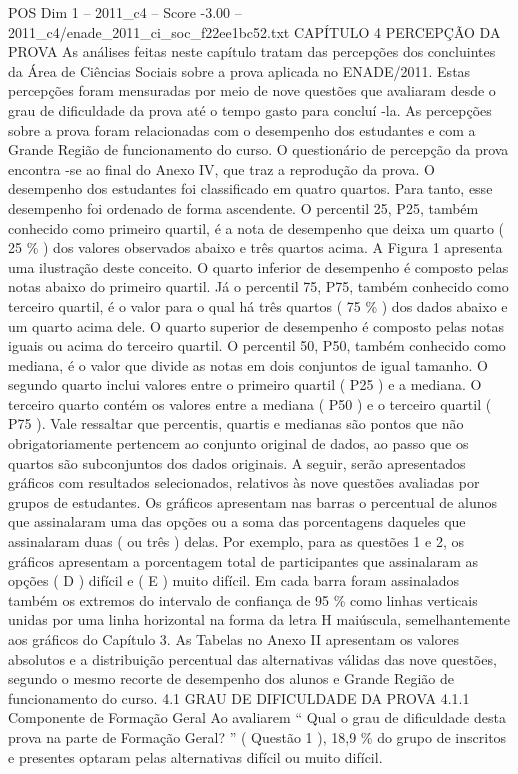 \begin{textsample}{POS Dim 1 – 2011\_c4 – Score -3.00 – 2011\_c4/enade\_2011\_ci\_soc\_f22ee1bc52.txt}  \label{ex:f1_pos_323}
CAPÍTULO 4 PERCEPÇÃO DA PROVA As análises feitas neste capítulo tratam das percepções dos concluintes da Área de Ciências Sociais sobre a prova aplicada no ENADE/2011.
Estas percepções foram mensuradas por meio de nove questões que avaliaram desde o grau de dificuldade da prova até o tempo gasto para concluí -la.
As percepções sobre a prova foram relacionadas com o desempenho dos estudantes e com a Grande Região de funcionamento do curso.
O questionário de percepção da prova encontra -se ao final do Anexo IV, que traz a reprodução da prova.
O desempenho dos estudantes foi classificado em quatro quartos.
Para tanto, esse desempenho foi ordenado de forma ascendente.
O percentil 25, P25, também conhecido como primeiro quartil, é a nota de desempenho que deixa um quarto ( 25 \% ) dos valores observados abaixo e três quartos acima.
A Figura 1 apresenta uma ilustração deste conceito.
O quarto inferior de desempenho é composto pelas notas abaixo do primeiro quartil.
Já o percentil 75, P75, também conhecido como terceiro quartil, é o valor para o qual há três quartos ( 75 \% ) dos dados abaixo e um quarto acima dele.
O quarto superior de desempenho é composto pelas notas iguais ou acima do terceiro quartil.
O percentil 50, P50, também conhecido como mediana, é o valor que divide as notas em dois conjuntos de igual tamanho.
O segundo quarto inclui valores entre o primeiro quartil ( P25 ) e a mediana.
O terceiro quarto contém os valores entre a mediana ( P50 ) e o terceiro quartil ( P75 ).
Vale ressaltar que percentis, quartis e medianas são pontos que não obrigatoriamente pertencem ao conjunto original de dados, ao passo que os quartos são subconjuntos dos dados originais.
A seguir, serão apresentados gráficos com resultados selecionados, relativos às nove questões avaliadas por grupos de estudantes.
Os gráficos apresentam nas barras o percentual de alunos que assinalaram uma das opções ou a soma das porcentagens daqueles que assinalaram duas ( ou três ) delas.
Por exemplo, para as questões 1 e 2, os gráficos apresentam a porcentagem total de participantes que assinalaram as opções ( D ) difícil e ( E ) muito difícil.
Em cada barra foram assinalados também os extremos do intervalo de confiança de 95 \% como linhas verticais unidas por uma linha horizontal na forma da letra H maiúscula, semelhantemente aos gráficos do Capítulo 3.
As Tabelas no Anexo II apresentam os valores absolutos e a distribuição percentual das alternativas válidas das nove questões, segundo o mesmo recorte de desempenho dos alunos e Grande Região de funcionamento do curso. 4.1 GRAU DE DIFICULDADE DA PROVA 4.1.1 Componente de Formação Geral Ao avaliarem “ Qual o grau de dificuldade desta prova na parte de Formação Geral? ” ( Questão 1 ), 18,9 \% do grupo de inscritos e presentes optaram pelas alternativas difícil ou muito difícil.

\end{textsample}
